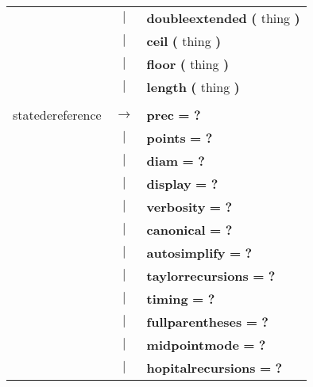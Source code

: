 \begin{tabular}{lcl}
 & $|$ & \textbf{doubleextended} \textbf{(} thing \textbf{)} \\
 & $|$ & \textbf{ceil} \textbf{(} thing \textbf{)} \\
 & $|$ & \textbf{floor} \textbf{(} thing \textbf{)} \\
 & $|$ & \textbf{length} \textbf{(} thing \textbf{)} \\
 & & \\
statedereference & $\rightarrow$ & \textbf{prec} \textbf{=} \textbf{?} \\
 & $|$ & \textbf{points} \textbf{=} \textbf{?} \\
 & $|$ & \textbf{diam} \textbf{=} \textbf{?} \\
 & $|$ & \textbf{display} \textbf{=} \textbf{?} \\
 & $|$ & \textbf{verbosity} \textbf{=} \textbf{?} \\
 & $|$ & \textbf{canonical} \textbf{=} \textbf{?} \\
 & $|$ & \textbf{autosimplify} \textbf{=} \textbf{?} \\
 & $|$ & \textbf{taylorrecursions} \textbf{=} \textbf{?} \\
 & $|$ & \textbf{timing} \textbf{=} \textbf{?} \\
 & $|$ & \textbf{fullparentheses} \textbf{=} \textbf{?} \\
 & $|$ & \textbf{midpointmode} \textbf{=} \textbf{?} \\
 & $|$ & \textbf{hopitalrecursions} \textbf{=} \textbf{?} \\
\end{tabular} \\
